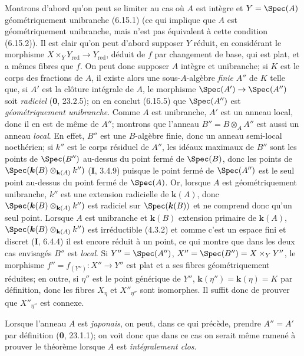 Montrons d'abord qu'on peut se limiter au cas où $A$ est intègre et $Y=\Spec(A)$ géométriquement unibranche (6.15.1) (ce qui implique que $A$ est géométriquement unibranche, mais n'est pas équivalent à cette condition (6.15.2)). Il est clair qu'on peut d'abord supposer $Y$ réduit, en considérant le morphisme $X\times_Y Y_{\mathrm{red}}\to Y_{\mathrm{red}}$, déduit de $f$ par changement de base, qui est plat, et a mêmes fibres que $f$. On peut donc supposer $A$ intègre et unibranche; si $K$ est le corps des fractions de $A$, il existe alors une sous-$A$-algèbre \emph{finie} $A''$ de $K$ telle que, si $A'$ est la clôture intégrale de $A$, le morphisme $\Spec(A')\to\Spec(A'')$ soit \emph{radiciel} (\textbf{0}, 23.2.5); on en conclut (6.15.5) que $\Spec(A'')$ est \emph{géométriquement unibranche}. Comme $A$ est unibranche, $A'$ est un anneau local, donc il en est de même de $A''$; montrons que l'anneau $B''=B\otimes_A A''$ est aussi un anneau \emph{local}. En effet, $B''$ est une $B$-algèbre finie, donc un anneau semi-local noethérien; si $k''$ est le corps résiduel de $A''$, les idéaux maximaux de $B''$ sont les points de $\Spec(B'')$ au-dessus du point fermé de $\Spec(B)$, donc les points de $\Spec(\boldsymbol{k}(B)\otimes_{\mathbf{k}(A)}k'')$ (\textbf{I}, 3.4.9)
puisque le point fermé de $\Spec(A'')$ est le seul point au-dessus du point fermé de $\Spec(A)$. Or, lorsque $A$ est géométriquement unibranche, $k''$ est une extension radicielle de $\boldsymbol{k}(A)$, donc $\Spec(\boldsymbol{k}(B)\otimes_{\mathbf{k}(A)}k'')$ est radiciel sur $\Spec(\boldsymbol{k}(B))$ et ne comprend donc qu'un seul point. Lorsque $A$ est unibranche et $\boldsymbol{k}(B)$ extension primaire de $\boldsymbol{k}(A)$, $\Spec(\boldsymbol{k}(B)\otimes_{\mathbf{k}(A)}k'')$ est irréductible (4.3.2) et comme c'est un espace fini et discret (\textbf{I}, 6.4.4) il est encore réduit à un point, ce qui montre que dans les deux cas envisagés $B''$ est \emph{local}. Si $Y''=\Spec(A'')$, $X''=\Spec(B'')=X\times_Y Y''$, le morphisme $f''=f_{(Y'')}:X''\to Y''$ est plat et a ses fibres géométriquement réduites; en outre, si $\eta''$ est le point générique de $Y''$, $\boldsymbol{k}(\eta'')=\boldsymbol{k}(\eta)=K$ par définition, donc les fibres $X_\eta$ et $X''_{\eta''}$ sont isomorphes. Il suffit donc de prouver que $X''_{\eta''}$ est connexe.

\begin{remark}[18.9.7.1]
\label{IV.18.9.7.1}
Lorsque l'anneau $A$ est \emph{japonais}, on peut, dans ce qui précède, prendre $A''=A'$ par définition (\textbf{0}, 23.1.1); on voit donc que dans ce cas on serait même ramené à prouver le théorème lorsque $A$ est \emph{intégralement clos}.
\end{remark}

